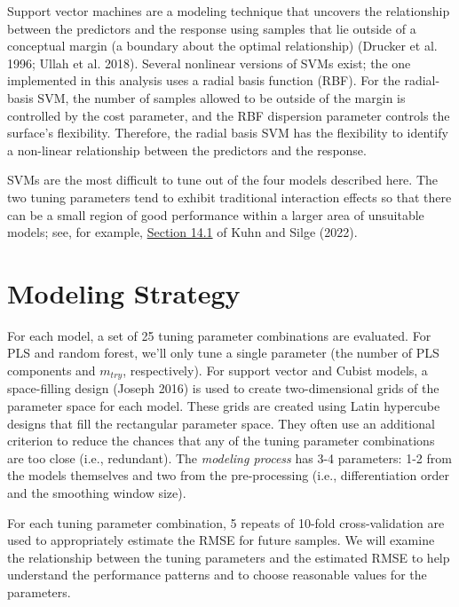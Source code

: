 \documentclass[
  letterpaper,
  DIV=11,
  numbers=noendperiod]{scrartcl}
\begin{document}
Support vector machines are a modeling technique that uncovers the
relationship between the predictors and the response using samples that
lie outside of a conceptual margin (a boundary about the optimal
relationship) (Drucker et al. 1996; Ullah et al. 2018). Several
nonlinear versions of SVMs exist; the one implemented in this analysis
uses a radial basis function (RBF). For the radial-basis SVM, the number
of samples allowed to be outside of the margin is controlled by the cost
parameter, and the RBF dispersion parameter controls the surface's
flexibility. Therefore, the radial basis SVM has the flexibility to
identify a non-linear relationship between the predictors and the
response.

SVMs are the most difficult to tune out of the four models described
here. The two tuning parameters tend to exhibit traditional interaction
effects so that there can be a small region of good performance within a
larger area of unsuitable models; see, for example,
\href{https://www.tmwr.org/iterative-search\#svm}{Section 14.1} of Kuhn
and Silge (2022).

\hypertarget{modeling-strategy}{%
\section{Modeling Strategy}\label{modeling-strategy}}

For each model, a set of 25 tuning parameter combinations are evaluated.
For PLS and random forest, we'll only tune a single parameter (the
number of PLS components and \(m_{try}\), respectively). For support
vector and Cubist models, a space-filling design (Joseph 2016) is used
to create two-dimensional grids of the parameter space for each model.
These grids are created using Latin hypercube designs that fill the
rectangular parameter space. They often use an additional criterion to
reduce the chances that any of the tuning parameter combinations are too
close (i.e., redundant). The \emph{modeling process} has 3-4 parameters:
1-2 from the models themselves and two from the pre-processing (i.e.,
differentiation order and the smoothing window size).

For each tuning parameter combination, 5 repeats of 10-fold
cross-validation are used to appropriately estimate the RMSE for future
samples. We will examine the relationship between the tuning parameters
and the estimated RMSE to help understand the performance patterns and
to choose reasonable values for the parameters.
\end{document}
